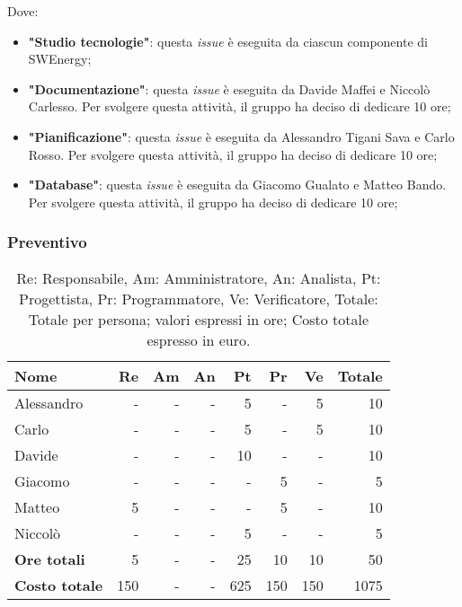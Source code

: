 Dove:
\begin{itemize}
	\item \textbf{"Studio tecnologie"}: questa \textit{issue} è eseguita da
	      ciascun componente di SWEnergy;

	\item \textbf{"Documentazione"}: questa \textit{issue} è eseguita da
	      Davide Maffei e Niccolò Carlesso. Per svolgere questa attività, il
	      gruppo ha deciso di dedicare 10 ore;

	\item \textbf{"Pianificazione"}: questa \textit{issue} è eseguita da
	      Alessandro Tigani Sava e Carlo Rosso. Per svolgere questa attività,
	      il gruppo ha deciso di dedicare 10 ore;

	\item \textbf{"Database"}: questa \textit{issue} è eseguita da
	      Giacomo Gualato e Matteo Bando. Per svolgere questa attività, il
	      gruppo ha deciso di dedicare 10 ore;
\end{itemize}

\subsubsection{Preventivo}

\begin{table}[H]
	\centering
	\begin{tabular}{l|r|r|r|r|r|r|r}
		\textbf{Nome}         & \textbf{Re} & \textbf{Am} & \textbf{An} & \textbf{Pt} & \textbf{Pr} & \textbf{Ve} & \textbf{Totale} \\
		\hline
		Alessandro            & -           & -           & -           & 5           & -           & 5           & 10              \\
		Carlo                 & -           & -           & -           & 5           & -           & 5           & 10              \\
		Davide                & -           & -           & -           & 10          & -           & -           & 10              \\
		Giacomo               & -           & -           & -           & -           & 5           & -           & 5               \\
		Matteo                & 5           & -           & -           & -           & 5           & -           & 10              \\
		Niccolò               & -           & -           & -           & 5           & -           & -           & 5               \\
		\hline
		\textbf{Ore totali}   & 5           & -           & -           & 25          & 10          & 10          & 50              \\
		\textbf{Costo totale} & 150         & -           & -           & 625         & 150         & 150         & 1075
	\end{tabular}
	\caption{Re: Responsabile, Am: Amministratore, An: Analista, Pt: Progettista,
		Pr: Programmatore, Ve: Verificatore, Totale: Totale per persona; valori espressi in ore; Costo totale espresso in euro.}
\end{table}

